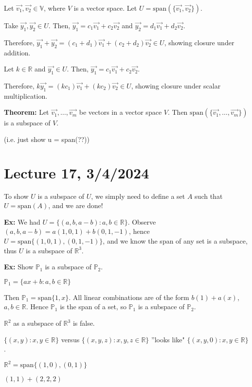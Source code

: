 \documentclass{article}
\begin{document}
Let $\vec{v_1}, \vec{v_2} \in \mathbb{V}$, where $V$ is a vector space. Let $U = \text{span}(\{\vec{v_1}, \vec{v_2}\})$.

Take $\vec{y_1}, \vec{y_2} \in U$. Then, $\vec{y_1} = c_1\vec{v_1} + c_2\vec{v_2}$ and $\vec{y_2} = d_1\vec{v_1} + d_2\vec{v_2}$. 

Therefore, $\vec{y_1} + \vec{y_2} = (c_1 + d_1)\vec{v_1} + (c_2 + d_2)\vec{v_2} \in U$, showing closure under addition.

Let $k \in \mathbb{R}$ and $\vec{y_1} \in U$. Then, $\vec{y_1} = c_1\vec{v_1} + c_2\vec{v_2}$. 

Therefore, $k\vec{y_1} = (kc_1)\vec{v_1} + (kc_2)\vec{v_2} \in U$, showing closure under scalar multiplication.


\textbf{Theorem:} Let $\vec{v_1}, \ldots, \vec{v_m}$ be vectors in a vector space $V$. Then $\text{span}(\{\vec{v_1}, \ldots, \vec{v_m}\})$ is a subspace of $V$.


(i.e. just show u = span(??))



\section{Lecture 17, 3/4/2024}

To show $U$ is a subspace of $U$, we simply need to define a set $A$ such that $U = \text{span}(A)$, and we are done!

\textbf{Ex:} We had $U = \{(a,b,a-b): a,b \in \mathbb{R}\}$. Observe $(a,b,a-b) = a(1,0,1)+b(0,1,-1)$, hence $U = \text{span}\{(1,0,1), (0,1,-1)\}$, and we know the span of any set is a subspace, thus $U$ is a subspace of $\mathbb{R}^3$.

\textbf{Ex:} Show $\mathbb{P}_1$ is a subspace of $\mathbb{P}_2$.

$\mathbb{P}_1 = \{ax+b : a,b \in \mathbb{R}\}$

Then $\mathbb{P}_1 = \text{span}\{1, x\}$. All linear combinations are of the form $b(1)+a(x)$, $a,b \in \mathbb{R}$. Hence $\mathbb{P}_1$ is the span of a set, so $\mathbb{P}_1$ is a subspace of $\mathbb{P}_2$.

$\mathbb{R}^2$ as a subspace of $\mathbb{R}^3$ is false.

$\{(x,y) : x, y \in \mathbb{R}\}$ versus $\{(x,y,z) : x,y,z \in \mathbb{R}\}$ ''looks like" $\{(x, y, 0) : x, y \in \mathbb{R}\}$.

$\mathbb{R}^2 = \text{span}\{(1,0),(0,1)\}$

$(1,1)+(2,2,2)$
\end{document}
